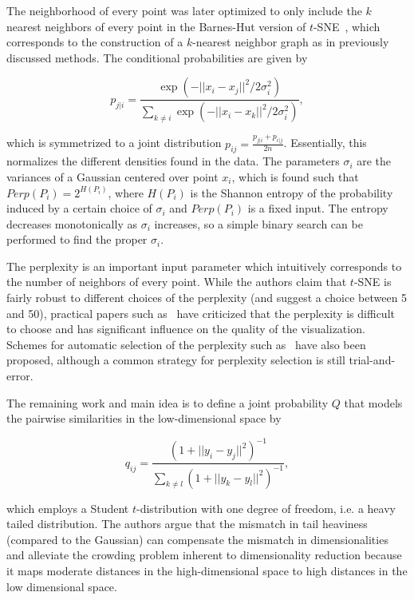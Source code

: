 The neighborhood of every point was later optimized to only include the $k$
nearest neighbors of every point in the Barnes-Hut version of
$t$-SNE~\cite{bhtsne}, which corresponds to the construction of a $k$-nearest
neighbor graph as in previously discussed methods. The conditional
probabilities are given by

\begin{equation}
    p_{j | i} = \frac{\exp(-||x_i - x_j||^2 / 2\sigma_i^2)}{\sum_{k \neq i} \exp(-||x_i - x_k||^2 / 2\sigma_i^2)},
\end{equation}

which is symmetrized to a joint distribution $p_{ij} = \frac{p_{j | i} + p_{i |
j}}{2n}$. Essentially, this normalizes the different densities found in the
data. The parameters $\sigma_i$ are the variances of a Gaussian centered over
point $x_i$, which is found such that $Perp(P_i) = 2^{H(P_i)}$, where $H(P_i)$
is the Shannon entropy of the probability induced by a certain choice of
$\sigma_i$ and $Perp(P_i)$ is a fixed input. The entropy decreases
monotonically as $\sigma_i$ increases, so a simple binary search can be
performed to find the proper $\sigma_i$.

The perplexity is an important input parameter which intuitively corresponds to the
number of neighbors of every point. While the authors claim that $t$-SNE is fairly
robust to different choices of the perplexity (and suggest a choice between 5 and 50), practical papers such as~\cite{art_tsne}
have criticized that the perplexity is difficult to choose and has significant
influence on the quality of the visualization. Schemes for automatic selection of
the perplexity such as~\cite{automatic_tsne} have also been proposed, although a common
strategy for perplexity selection is still trial-and-error.

The remaining work and main idea is to define a joint probability $Q$ that models the
pairwise similarities in the low-dimensional space by

\begin{equation}
    q_{ij} = \frac{(1 + || y_i - y_j ||^2)^{-1}}{\sum_{k \neq l } ( 1 + ||y_k - y_l ||^2)^{-1}},
\end{equation}

which employs a Student $t$-distribution with  one degree of freedom, i.e. a heavy tailed
distribution. The authors argue that the mismatch in tail heaviness (compared to the Gaussian) can compensate the
mismatch in dimensionalities and alleviate the crowding problem inherent to dimensionality reduction because
it maps moderate distances in the high-dimensional space to high distances in the low
dimensional space.

